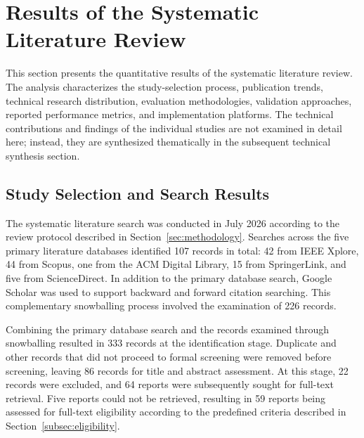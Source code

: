 \section{Results of the Systematic Literature Review}
\label{sec:results}

This section presents the quantitative results of the systematic literature review. The analysis characterizes the study-selection process, publication trends, technical research distribution, evaluation methodologies, validation approaches, reported performance metrics, and implementation platforms. The technical contributions and findings of the individual studies are not examined in detail here; instead, they are synthesized thematically in the subsequent technical synthesis section.

\subsection{Study Selection and Search Results}
\label{subsec:study_selection_results}

The systematic literature search was conducted in July 2026 according to the review protocol described in Section~\ref{sec:methodology}. Searches across the five primary literature databases identified 107 records in total: 42 from IEEE Xplore, 44 from Scopus, one from the ACM Digital Library, 15 from SpringerLink, and five from ScienceDirect. In addition to the primary database search, Google Scholar was used to support backward and forward citation searching. This complementary snowballing process involved the examination of 226 records.

Combining the primary database search and the records examined through snowballing resulted in 333 records at the identification stage. Duplicate and other records that did not proceed to formal screening were removed before screening, leaving 86 records for title and abstract assessment. At this stage, 22 records were excluded, and 64 reports were subsequently sought for full-text retrieval. Five reports could not be retrieved, resulting in 59 reports being assessed for full-text eligibility according to the predefined criteria described in Section~\ref{subsec:eligibility}.

